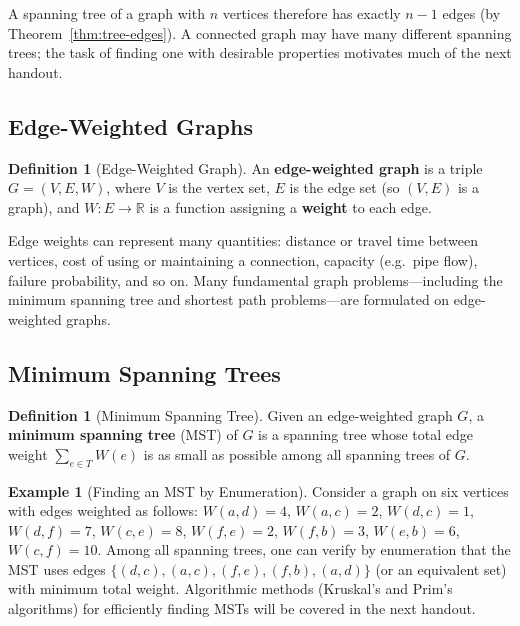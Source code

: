 \documentclass[11pt, a4paper, notitlepage]{report}
\theoremstyle{definition}
\newtheorem{definition}[theorem]{Definition}
\newtheorem{example}[theorem]{Example}
\theoremstyle{remark}
\begin{document}
A spanning tree of a graph with $n$ vertices therefore has exactly $n - 1$ edges (by Theorem~\ref{thm:tree-edges}). A connected graph may have many different spanning trees; the task of finding one with desirable properties motivates much of the next handout.

\subsection{Edge-Weighted Graphs}
\label{subsec:edge-weighted}

\begin{definition}[Edge-Weighted Graph]
\label{def:edge-weighted}
An \textbf{edge-weighted graph} is a triple $G = (V, E, W)$, where $V$ is the vertex set, $E$ is the edge set (so $(V, E)$ is a graph), and
$W \colon E \to \mathbb{R}$ is a function assigning a \textbf{weight} to each edge.
\end{definition}

Edge weights can represent many quantities: distance or travel time between vertices, cost of using or maintaining a connection, capacity (e.g.\ pipe flow), failure probability, and so on. Many fundamental graph problems---including the minimum spanning tree and shortest path problems---are formulated on edge-weighted graphs.

\subsection{Minimum Spanning Trees}
\label{subsec:mst}

\begin{definition}[Minimum Spanning Tree]
\label{def:mst}
Given an edge-weighted graph $G$, a \textbf{minimum spanning tree} (MST) of $G$ is a spanning tree whose total edge weight $\sum_{e \in T} W(e)$ is as small as possible among all spanning trees of $G$.
\end{definition}

\begin{example}[Finding an MST by Enumeration]
\label{ex:mst-enumerate}
Consider a graph on six vertices with edges weighted as follows: $W(a,d)=4$, $W(a,c)=2$, $W(d,c)=1$, $W(d,f)=7$, $W(c,e)=8$, $W(f,e)=2$, $W(f,b)=3$, $W(e,b)=6$, $W(c,f)=10$. Among all spanning trees, one can verify by enumeration that the MST uses edges $\{(d,c), (a,c), (f,e), (f,b), (a,d)\}$ (or an equivalent set) with minimum total weight. Algorithmic methods (Kruskal's and Prim's algorithms) for efficiently finding MSTs will be covered in the next handout.
\end{example}
\end{document}
